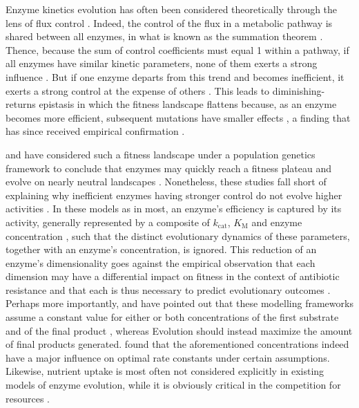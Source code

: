 \documentclass[11pt,onecolumn]{article}
\begin{document}
Enzyme kinetics evolution has often been considered theoretically through the lens of flux control \citep{Burns85,Clark91,Fell92,Kacser95,Yi19}. Indeed, the control of the flux in a metabolic pathway is shared between all enzymes, in what is known as the summation theorem \citep{Kacser73,Heinrich74}. Thence, because the sum of control coefficients must equal 1 within a pathway, if all enzymes have similar kinetic parameters, none of them exerts a strong influence \citep{Dean95}. But if one enzyme departs from this trend and becomes inefficient, it exerts a strong control at the expense of others \citep{Dykhuizen90}. This leads to diminishing-returns epistasis in which the fitness landscape flattens because, as an enzyme becomes more efficient, subsequent mutations have smaller effects \citep{Kacser73,Dykhuizen87,Tokuriki12}, a finding that has since received empirical confirmation \citep{Fell92,Dean95,Lunzer05,Yi19,Chou14}.

\citep{Hartl85} and \citep{Dean86} have considered such a fitness landscape under a population genetics framework to conclude that enzymes may quickly reach a fitness plateau and evolve on nearly neutral landscapes \citep{Ohta92}. Nonetheless, these studies fall short of explaining why inefficient enzymes having stronger control do not evolve higher activities \citep{Yi19}. In these models as in most, an enzyme's efficiency is captured by its activity, generally represented by a composite of $k_\text{cat}$, $K_\text{M}$ and enzyme concentration \citep{Hartl85,Clark91,Chou14,Kaltenbach14}, such that the distinct evolutionary dynamics of these parameters, together with an enzyme's concentration, is ignored. This reduction of an enzyme's dimensionality goes against the empirical observation that each dimension may have a differential impact on fitness in the context of antibiotic resistance \citep{Walkiewicz12,Stiffler15,Rodrigues16} and that each is thus necessary to predict evolutionary outcomes \citep{Walkiewicz12}.\\

Perhaps more importantly, \citep{Heinrich91} and \citep{Schuster08} have pointed out that these modelling frameworks assume a constant value for either or both concentrations of the first substrate and of the final product \citep{Orth10}, whereas Evolution should instead maximize the amount of final products generated. \citep{Klipp94} found that the aforementioned concentrations indeed have a major influence on optimal rate constants under certain assumptions. 
Likewise, nutrient uptake is most often not considered explicitly in existing models of enzyme evolution, while it is obviously critical in the competition for resources \citep{Dykhuizen94}. 
\end{document}
